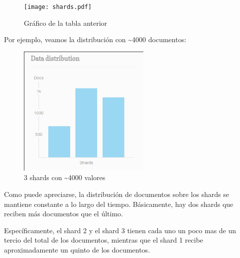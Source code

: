 \begin{figure}[H]
 \centering
 \texttt{[image: shards.pdf]}
 \caption{Gráfico de la tabla anterior}
 \label{fig:shardslinea}
\end{figure}


Por ejemplo, veamos la distribución con \textasciitilde 4000 documentos:
\begin{figure}[H]
 \centering
 \includegraphics[width=2.5in]{sharding/img/3shard4000.png}
 \caption{3 shards con \textasciitilde 4000 valores}
 \label{fig:3shard4000}
\end{figure}

Como puede apreciarse, la distribución de documentos sobre los shards se mantiene constante a lo largo del tiempo. Básicamente, hay dos shards que reciben más documentos que el último.

Específicamente, el shard 2 y el shard 3 tienen cada uno un poco mas de un tercio del total de los documentos, mientras que el shard 1 recibe aproximadamente un quinto de los documentos.
